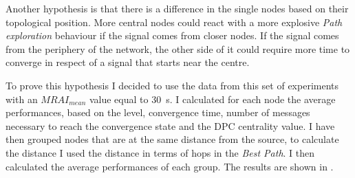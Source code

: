 Another hypothesis is that there is a difference in the single nodes based
on their topological position.
More central nodes could react with a more explosive \textit{Path exploration}
behaviour if the signal comes from closer nodes.
If the signal comes from the periphery of the network, the other side of
it could require more time to converge in respect of a signal that starts
near the centre.

To prove this hypothesis I decided to use the data from this set of experiments
with an \(MRAI_{mean}\) value equal to \SI{30}{\second}.
I calculated for each node the average performances, based on the level, convergence
time, number of messages necessary to reach the convergence state and the \ac{DPC}
centrality value.
I have then grouped nodes that are at the same distance from the source, to
calculate the distance I used the distance in terms of hops in the \textit{Best
Path}.
I then calculated the average performances of each group.
The results are shown in .

